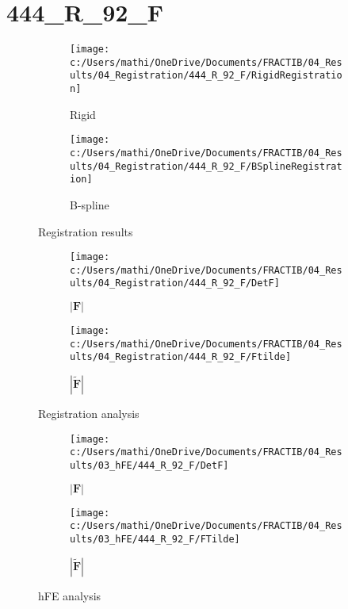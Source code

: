 \documentclass{article}%
\begin{document}
%
\newpage%
\section*{444\_R\_92\_F}%
\label{sec:444R92F}%


\begin{figure}[h!]%
\begin{subfigure}[b]{0.5\linewidth}%
\texttt{[image: c:/Users/mathi/OneDrive/Documents/FRACTIB/04\_Results/04\_Registration/444\_R\_92\_F/RigidRegistration]}%
\caption{Rigid}%
\end{subfigure}%
\begin{subfigure}[b]{0.5\linewidth}%
\texttt{[image: c:/Users/mathi/OneDrive/Documents/FRACTIB/04\_Results/04\_Registration/444\_R\_92\_F/BSplineRegistration]}%
\caption{B{-}spline}%
\end{subfigure}%
\caption{Registration results}%
\end{figure}

%


\begin{figure}[h!]%
\begin{subfigure}[b]{0.5\linewidth}%
\texttt{[image: c:/Users/mathi/OneDrive/Documents/FRACTIB/04\_Results/04\_Registration/444\_R\_92\_F/DetF]}%
\caption{$|\mathbf{F}|$}%
\end{subfigure}%
\begin{subfigure}[b]{0.5\linewidth}%
\texttt{[image: c:/Users/mathi/OneDrive/Documents/FRACTIB/04\_Results/04\_Registration/444\_R\_92\_F/Ftilde]}%
\caption{$|\widetilde{\mathbf{F}}|$}%
\end{subfigure}%
\caption{Registration analysis}%
\end{figure}

%


\begin{figure}[h!]%
\begin{subfigure}[b]{0.5\linewidth}%
\texttt{[image: c:/Users/mathi/OneDrive/Documents/FRACTIB/04\_Results/03\_hFE/444\_R\_92\_F/DetF]}%
\caption{$|\mathbf{F}|$}%
\end{subfigure}%
\begin{subfigure}[b]{0.5\linewidth}%
\texttt{[image: c:/Users/mathi/OneDrive/Documents/FRACTIB/04\_Results/03\_hFE/444\_R\_92\_F/FTilde]}%
\caption{$|\widetilde{\mathbf{F}}|$}%
\end{subfigure}%
\caption{hFE analysis}%
\end{figure}
\end{document}
